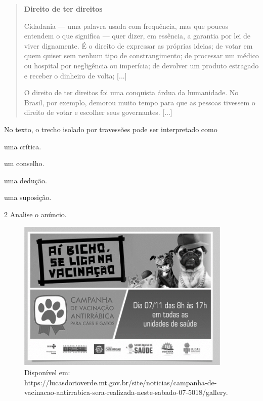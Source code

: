 \begin{quote}
\centering\textbf{Direito de ter direitos}

Cidadania --- uma palavra usada com frequência, mas que poucos entendem o
que significa --- quer dizer, em essência, a garantia por lei de viver
dignamente. É o direito de expressar as próprias ideias; de votar em
quem quiser sem nenhum tipo de constrangimento; de processar um médico
ou hospital por negligência ou imperícia; de devolver um produto
estragado e receber o dinheiro de volta; {[}...{]}

O direito de ter direitos foi uma conquista árdua da humanidade. No
Brasil, por exemplo, demorou muito tempo para que as pessoas tivessem o
direito de votar e escolher seus governantes. {[}...{]}

\end{quote}

No texto, o trecho isolado por travessões pode ser interpretado como

\begin{escolha}
\item uma crítica.

\item um conselho.

\item uma dedução.

\item uma suposição.
\end{escolha}

\num{2} Analise o anúncio.

\begin{figure}[H]
\centering
\includegraphics[width=4.03125in,height=2.85231in]{./imgSAEB_8_POR/media/image28.png}
\caption{Disponível em: https://lucasdorioverde.mt.gov.br/site/noticias/campanha-de-vacinacao-antirrabica-sera-realizada-neste-sabado-07-5018/gallery.}
\end{figure}

